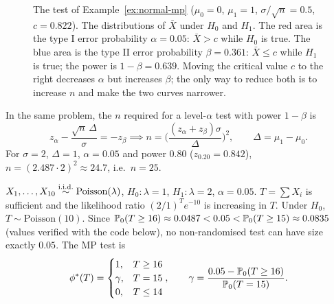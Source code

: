 \documentclass[main.tex]{subfiles}
\begin{document}
\begin{figure}[ht]
\caption{The test of Example~\ref{ex:normal-mp} ($\mu_0=0$, $\mu_1=1$, $\sigma/\sqrt n=0.5$, $c=0.822$). The distributions of $\bar X$ under $H_0$ and $H_1$. The red area is the type I error probability $\alpha=0.05$: $\bar X>c$ while $H_0$ is true. The blue area is the type II error probability $\beta=0.361$: $\bar X\le c$ while $H_1$ is true; the power is $1-\beta=0.639$. Moving the critical value $c$ to the right decreases $\alpha$ but increases $\beta$; the only way to reduce both is to increase $n$ and make the two curves narrower.}\label{fig:hata-turleri}
\end{figure}

\begin{example}\label{ex:orneklem-guc}
In the same problem, the $n$ required for a level-$\alpha$ test with power $1-\beta$ is
\[
z_\alpha-\frac{\sqrt n\,\Delta}{\sigma}=-z_\beta\implies n=\Big(\frac{(z_\alpha+z_\beta)\sigma}{\Delta}\Big)^2,\qquad\Delta=\mu_1-\mu_0 .
\]
For $\sigma=2$, $\Delta=1$, $\alpha=0.05$ and power $0.80$ ($z_{0.20}=0.842$), $n=(2.487\cdot2)^2\approx24.7$, i.e.\ $n=25$.
\end{example}

\begin{example}\label{ex:poisson-rastgele}
$X_1,\dots,X_{10}\iid\text{Poisson}(\lambda)$, $H_0:\lambda=1$, $H_1:\lambda=2$, $\alpha=0.05$. $T=\sum X_i$ is sufficient and the likelihood ratio $(2/1)^Te^{-10}$ is increasing in $T$. Under $H_0$, $T\sim\text{Poisson}(10)$. Since $\P_0(T\ge16)\approx0.0487<0.05<\P_0(T\ge15)\approx0.0835$ (values verified with the code below), no non-randomised test can have size exactly $0.05$. The MP test is
\[
\phi^*(T)=\begin{cases}1, & T\ge16\\ \gamma, & T=15\\ 0,& T\le14\end{cases},\qquad\gamma=\frac{0.05-\P_0(T\ge16)}{\P_0(T=15)}.
\]
\end{example}
\end{document}
